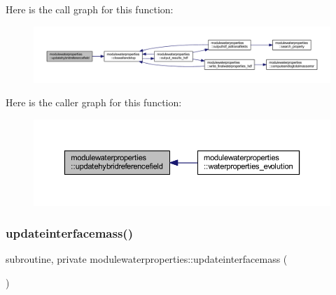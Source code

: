Here is the call graph for this function\+:\nopagebreak
\begin{figure}[H]
\begin{center}
\leavevmode
\includegraphics[width=350pt]{namespacemodulewaterproperties_a352c7f22b34ddac5b3bada0a33cd7221_cgraph}
\end{center}
\end{figure}
Here is the caller graph for this function\+:\nopagebreak
\begin{figure}[H]
\begin{center}
\leavevmode
\includegraphics[width=350pt]{namespacemodulewaterproperties_a352c7f22b34ddac5b3bada0a33cd7221_icgraph}
\end{center}
\end{figure}
\mbox{\label{namespacemodulewaterproperties_a20082ef8bcaf7ce51aa737521cbeea5b}} 
\subsubsection{\texorpdfstring{updateinterfacemass()}{updateinterfacemass()}}
{\footnotesize\ttfamily subroutine, private modulewaterproperties\+::updateinterfacemass (\begin{DoxyParamCaption}{ }\end{DoxyParamCaption})\hspace{0.3cm}{\ttfamily [private]}}

